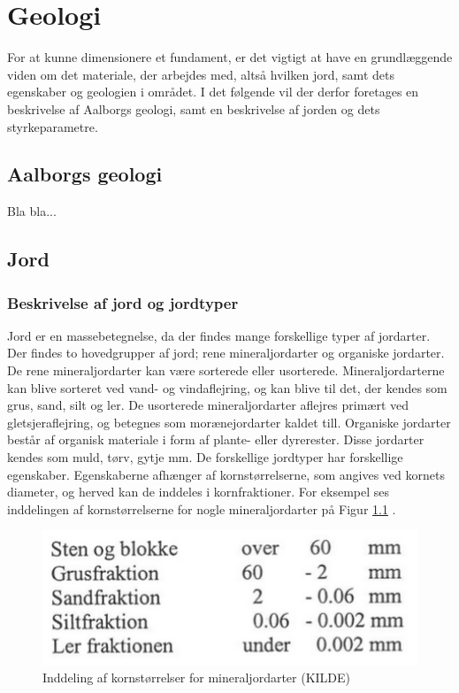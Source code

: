 \chapter{Geologi}

For at kunne dimensionere et fundament, er det vigtigt at have en grundlæggende viden om det materiale, der arbejdes med, altså hvilken jord, samt dets egenskaber og geologien i området. I det følgende vil der derfor foretages en beskrivelse af Aalborgs geologi, samt en beskrivelse af jorden og dets styrkeparametre.

\section{Aalborgs geologi}

Bla bla...

\section{Jord}
\subsection{Beskrivelse af jord og jordtyper}
Jord er en massebetegnelse, da der findes mange forskellige typer af jordarter. Der findes to hovedgrupper af jord; rene mineraljordarter og organiske jordarter. 
\newline \indent{     }  De rene mineraljordarter kan være sorterede eller usorterede. Mineraljordarterne kan blive sorteret ved vand- og vindaflejring, og kan blive til det, der kendes som grus, sand, silt og ler. De usorterede mineraljordarter aflejres primært ved gletsjeraflejring, og betegnes som morænejordarter kaldet till.\citep{jordarter}
\newline \indent{     }  Organiske jordarter består af organisk materiale i form af plante- eller dyrerester. Disse jordarter kendes som muld, tørv, gytje mm.\citep{miljo}
\newline \indent{     }  De forskellige jordtyper har forskellige egenskaber. Egenskaberne afhænger af kornstørrelserne, som angives ved kornets diameter, og herved kan de inddeles i kornfraktioner\citep{geoteknik}. For eksempel ses inddelingen af kornstørrelserne for nogle mineraljordarter på Figur \ref{fig:kornstorrelser} .

\begin{figure}[htbp] \centering
	\begin{minipage}[b]{0.48\textwidth}\centering
		\includegraphics[width=1.0\textwidth]{billeder/kornetsdiameter.png}
		\caption{Inddeling af kornstørrelser for mineraljordarter (KILDE)}
		\label{fig:kornstorrelser}
	\end{minipage}\hfill
\end{figure}

